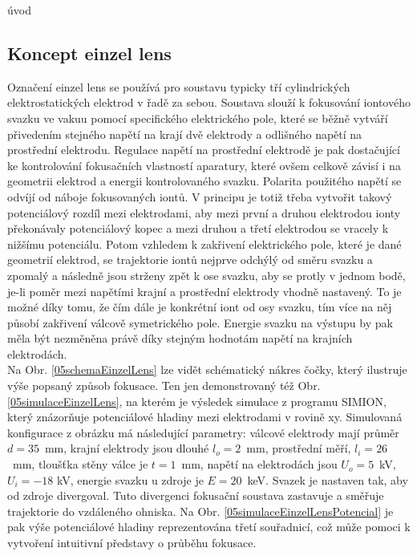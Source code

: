 úvod

\subsection{Koncept einzel lens}

Označení einzel lens se používá pro soustavu typicky tří cylindrických elektrostatických elektrod v řadě za sebou. Soustava slouží k fokusování iontového svazku ve vakuu pomocí specifického elektrického pole, které se běžně vytváří přivedením stejného napětí na krají dvě elektrody a odlišného napětí na prostřední elektrodu. Regulace napětí na prostřední elektrodě je pak dostačující ke kontrolování fokusačních vlastností aparatury, které ovšem celkově závisí i na geometrii elektrod a energii kontrolovaného svazku. Polarita použitého napětí se odvíjí od náboje fokusovaných iontů. V principu je totiž třeba vytvořit takový potenciálový rozdíl mezi elektrodami, aby mezi první a druhou elektrodou ionty překonávaly potenciálový kopec a mezi druhou a třetí elektrodou se vracely k nižšímu potenciálu. Potom vzhledem k zakřivení elektrického pole, které je dané geometrií elektrod, se trajektorie iontů nejprve odchýlý od směru svazku a zpomalý a následně jsou strženy zpět k ose svazku, aby se protly v jednom bodě, je-li poměr mezi napětími krajní a prostřední elektrody vhodně nastavený. To je možné díky tomu, že čím dále je konkrétní iont od osy svazku, tím více na něj působí zakřivení válcově symetrického pole. Energie svazku na výstupu by pak měla být nezměněna právě díky stejným hodnotám napětí na krajních elektrodách.\\

Na Obr. \ref{05schemaEinzelLens} lze vidět schématický nákres čočky, který ilustruje výše popsaný způsob fokusace. Ten jen demonstrovaný též Obr. \ref{05simulaceEinzelLens}, na kterém je výsledek simulace z programu SIMION, který znázorňuje potenciálové hladiny mezi elektrodami v rovině xy. Simulovaná konfigurace z obrázku má následující parametry: válcové elektrody mají průměr $d=35$~mm, krajní elektrody jsou dlouhé $l_o = 2$~mm, prostřední měří, $l_i = 26$~mm, tloušťka stěny válce je $t=1$~mm, napětí na elektrodách jsou $U_o = 5$~kV, $U_i = -18$ kV, energie svazku u zdroje je $E = 20$~keV. Svazek je nastaven tak, aby od zdroje divergoval. Tuto divergenci fokusační soustava zastavuje a směřuje trajektorie do vzdáleného ohniska. Na Obr. \ref{05simulaceEinzelLensPotencial} je pak výše potenciálové hladiny reprezentována třetí souřadnicí, což může pomoci k vytvoření intuitivní představy o průběhu fokusace.\\

